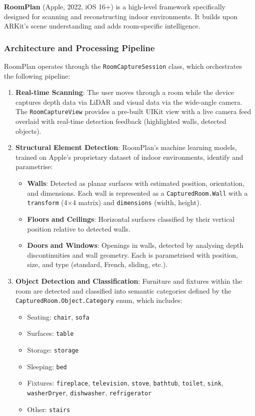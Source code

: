 \textbf{RoomPlan} (Apple, 2022, iOS 16+) is a high-level framework specifically designed for scanning and reconstructing indoor environments. It builds upon ARKit's scene understanding and adds room-specific intelligence.

\subsubsection{Architecture and Processing Pipeline}

RoomPlan operates through the \texttt{RoomCaptureSession} class, which orchestrates the following pipeline:

\begin{enumerate}
    \item \textbf{Real-time Scanning}: The user moves through a room while the device captures depth data via LiDAR and visual data via the wide-angle camera. The \texttt{RoomCaptureView} provides a pre-built UIKit view with a live camera feed overlaid with real-time detection feedback (highlighted walls, detected objects).

    \item \textbf{Structural Element Detection}: RoomPlan's machine learning models, trained on Apple's proprietary dataset of indoor environments, identify and parametrise:
    \begin{itemize}
        \item \textbf{Walls}: Detected as planar surfaces with estimated position, orientation, and dimensions. Each wall is represented as a \texttt{CapturedRoom.Wall} with a \texttt{transform} (4$\times$4 matrix) and \texttt{dimensions} (width, height).
        \item \textbf{Floors and Ceilings}: Horizontal surfaces classified by their vertical position relative to detected walls.
        \item \textbf{Doors and Windows}: Openings in walls, detected by analysing depth discontinuities and wall geometry. Each is parametrised with position, size, and type (standard, French, sliding, etc.).
    \end{itemize}

    \item \textbf{Object Detection and Classification}: Furniture and fixtures within the room are detected and classified into semantic categories defined by the \texttt{CapturedRoom.Object.Category} enum, which includes:
    \begin{itemize}
        \item Seating: \texttt{chair}, \texttt{sofa}
        \item Surfaces: \texttt{table}
        \item Storage: \texttt{storage}
        \item Sleeping: \texttt{bed}
        \item Fixtures: \texttt{fireplace}, \texttt{television}, \texttt{stove}, \texttt{bathtub}, \texttt{toilet}, \texttt{sink}, \texttt{washerDryer}, \texttt{dishwasher}, \texttt{refrigerator}
        \item Other: \texttt{stairs}
    \end{itemize}


\end{enumerate}
